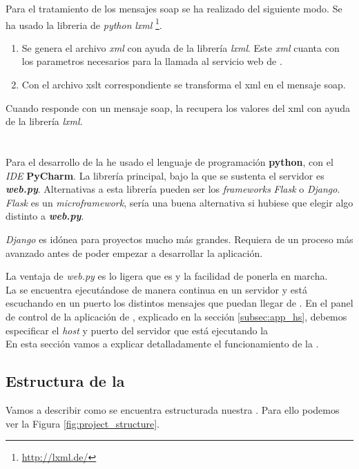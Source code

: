 Para el tratamiento de los mensajes \acrshort{soap} se ha realizado del siguiente modo.
Se ha usado la libreria de \textit{python} \textit{lxml} \footnote{\url{http://lxml.de/}}. 
\begin{enumerate}
	\item Se genera el archivo \textit{xml} con ayuda de la librería \textit{lxml}. Este \textit{xml} cuanta con los parametros necesarios para la llamada al servicio web de \wday{}.
	
	\item Con el archivo \acrshort{xslt} correspondiente se transforma el \acrshort{xml} en el mensaje \acrshort{soap}.
\end{enumerate}

Cuando \wday{} responde con un mensaje \acrshort{soap}, la \iface{} recupera los valores del \acrshort{xml} con ayuda de la librería \textit{lxml}.

\section{\iface{}}


Para el desarrollo de la \iface{} he usado el lenguaje de programación \textbf{python}, con el \textit{IDE} \textbf{PyCharm}. La librería principal, bajo la que se sustenta el servidor es \textbf{\textit{web.py}}.
Alternativas a esta librería pueden ser los \textit{frameworks} \textit{Flask} o \textit{Django}.
\textit{Flask} es un \textit{microframework}, sería una buena alternativa si hubiese que elegir algo distinto a  \textbf{\textit{web.py}}.

\textit{Django} es idónea para proyectos mucho más grandes. Requiera de un proceso más avanzado antes de poder empezar a desarrollar la aplicación.

La ventaja de \textit{web.py} es lo ligera que es y la facilidad de ponerla en marcha.\\

La \iface{} se encuentra ejecutándose de manera continua en un servidor y está escuchando en un puerto los distintos mensajes que puedan llegar de \hs{}.
En el panel de control de la aplicación de \hs{}, explicado en la sección \ref{subsec:app_hs}, debemos especificar el \textit{host} y puerto del servidor que está ejecutando la \iface{}\\


En esta sección vamos a explicar detalladamente el funcionamiento de la \iface{}.

\subsection{Estructura de la \iface{}}
Vamos a describir como se encuentra estructurada nuestra \iface. Para ello podemos ver la Figura \ref{fig:project_structure}. 

